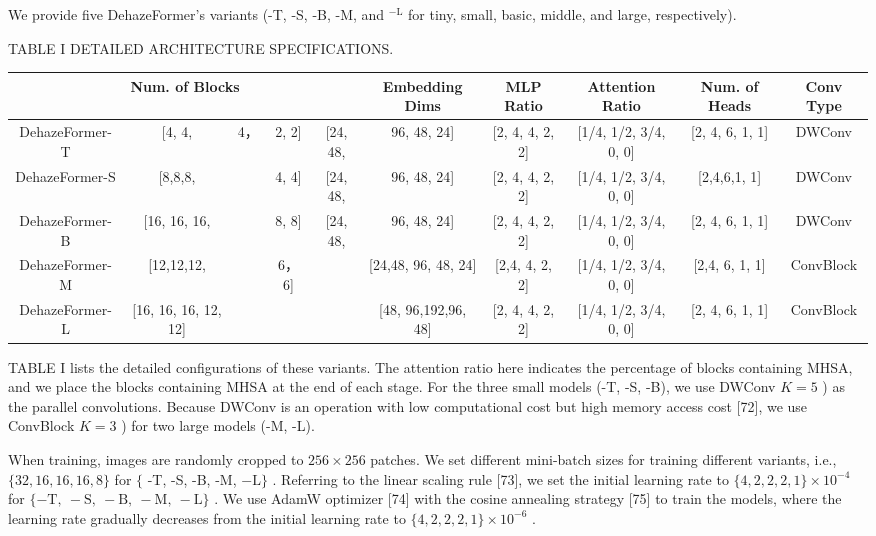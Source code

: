 We provide five DehazeFormer’s variants (-T, -S, -B, -M, and $^{-\mathrm{L}}$ for tiny, small, basic, middle, and large, respectively).

TABLE I DETAILED ARCHITECTURE SPECIFICATIONS.


\begin{table}[htbp]
\centering
\begin{tabular}{|c|c|c|c|c|c|c|c|c|c|}\hline
\multicolumn{5}{|c|}{Num. of Blocks} & Embedding Dims & MLP Ratio & Attention Ratio & Num. of Heads & Conv Type \\ \hline
DehazeFormer-T & [4, 4, & 4， & 2, 2] & [24, 48, & 96, 48, 24] & [2, 4, 4, 2, 2] & [1/4, 1/2, 3/4, 0, 0] & [2, 4, 6, 1, 1] & DWConv \\ \hline
DehazeFormer-S & [8,8,8, &  & 4, 4] & [24, 48, & 96, 48, 24] & [2, 4, 4, 2, 2] & [1/4, 1/2, 3/4, 0, 0] & [2,4,6,1, 1] & DWConv \\ \hline
DehazeFormer-B & [16, 16, 16, &  & 8, 8] & [24, 48, & 96, 48, 24] & [2, 4, 4, 2, 2] & [1/4, 1/2, 3/4, 0, 0] & [2, 4, 6, 1, 1] & DWConv \\ \hline
DehazeFormer-M & [12,12,12, &  & 6， 6] &  & [24,48, 96, 48, 24] & [2,4, 4, 2, 2] & [1/4, 1/2, 3/4, 0, 0] & [2,4, 6, 1, 1] & ConvBlock \\ \hline
DehazeFormer-L & [16, 16, 16, 12, 12] &  &  &  & [48, 96,192,96, 48] & [2, 4, 4, 2, 2] & [1/4, 1/2, 3/4, 0, 0] & [2, 4, 6, 1, 1] & ConvBlock \\ \hline
\end{tabular}\end{table}

TABLE I lists the detailed configurations of these variants. The attention ratio here indicates the percentage of blocks containing MHSA, and we place the blocks containing MHSA at the end of each stage. For the three small models (-T, -S, -B), we use DWConv $K=5$ ) as the parallel convolutions. Because DWConv is an operation with low computational cost but high memory access cost [72], we use ConvBlock $K=3$ ) for two large models (-M, -L).

When training, images are randomly cropped to $256\times256$ patches. We set different mini-batch sizes for training different variants, i.e., $\{32,16,16,16,8\}$ for $\{$ -T, -S, -B, -M, $-\mathrm{L}\}$ . Referring to the linear scaling rule [73], we set the initial learning rate to $\{4,2,2,2,1\}\times10^{-4}$ for $\{-\mathrm{{T},\ -{S},\ -{B},\ -{M},\ -\mathrm{{L}}}\}$ . We use AdamW optimizer [74] with the cosine annealing strategy [75] to train the models, where the learning rate gradually decreases from the initial learning rate to $\{4,2,2,2,1\}\times10^{-6}$ .

